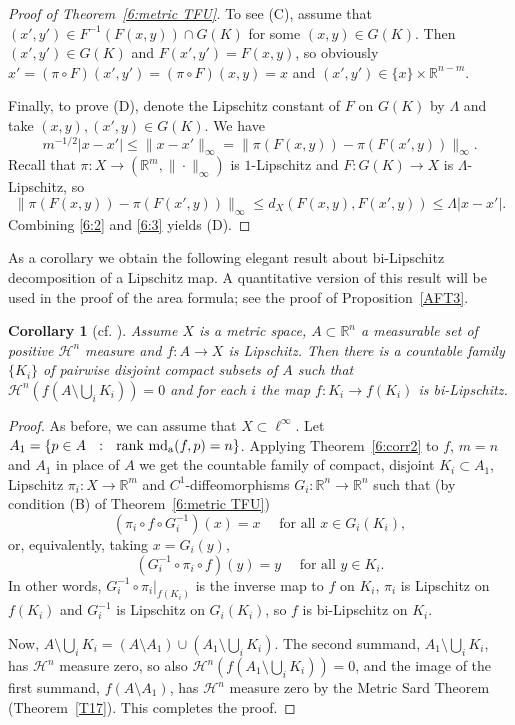 \documentclass[12pt,leqno]{amsart}
\newtheorem{corollary}[theorem]{Corollary}
\theoremstyle{definition}
\newcommand{\bbbr}{\mathbb R}
\def\H{{\mathcal H}}
\def\rank{{\rm rank\,}}
\def\apmd{\operatorname{md_{\rm a}}}
\numberwithin{theorem}{section} \numberwithin{equation}{section}
\begin{document}
\begin{proof}[Proof of Theorem~\ref{6:metric TFU}]
To see (C), assume that $(x',y')\in F^{-1}(F(x,y))\cap G(K)$ for some $(x,y)\in G(K)$. Then $(x',y')\in G(K)$ and $F(x',y')=F(x,y)$, so obviously $x'=(\pi\circ F)(x',y')=(\pi\circ F)(x,y)=x$ and $(x',y')\in \{x\}\times \bbbr^{n-m}$.

Finally, to prove (D), denote the Lipschitz constant of $F$ on $G(K)$ by $\Lambda$ and take $(x,y), (x',y)\in G(K)$. We have
\begin{equation}\label{6:2}
m^{-1/2}|x-x'|\leq \|x-x'\|_\infty=\|\pi(F(x,y))-\pi(F(x',y))\|_\infty.
\end{equation}
Recall that $\pi:X\to (\bbbr^m,\|\cdot\|_\infty)$ is $1$-Lipschitz and $F:G(K)\to X$ is $\Lambda$-Lipschitz, so
\begin{equation}
\label{6:3}
\|\pi(F(x,y))-\pi(F(x',y))\|_\infty\leq d_X(F(x,y),F(x',y))\leq \Lambda |x-x'|.
\end{equation}
Combining \eqref{6:2} and \eqref{6:3} yields (D).
\end{proof}
As a corollary we obtain the following elegant result about bi-Lipschitz decomposition of a Lipschitz map. A quantitative version of this result will be used in the proof of the area formula; see the proof of Proposition~\ref{AFT3}.
\begin{corollary}[cf. {\cite[Lemma 4]{kir}}]
Assume $X$ is a metric space, $A\subset \bbbr^n$ a measurable set of positive $\H^n$ measure and $f:A\to X$ is Lipschitz. Then there is a countable family $\{K_i\}$ of pairwise disjoint compact subsets of $A$ such that $\H^n(f(A\setminus \bigcup_i K_i))=0$ and for each $i$ the map $f:K_i\to f(K_i)$ is bi-Lipschitz.
\end{corollary}
\begin{proof}
As before, we can assume that $X\subset \ell^\infty$.
Let $A_1=\{p\in A~~:~~\rank \apmd(f,p)=n\}$. Applying Theorem~\ref{6:corr2} to $f$, $m=n$ and $A_1$ in place of $A$ we get the countable family of compact, disjoint $K_i\subset A_1$, Lipschitz $\pi_i:X\to\bbbr^m$ and $C^1$-diffeomorphisms $G_i:\bbbr^n\to\bbbr^n$ such that (by condition (B) of Theorem~\ref{6:metric TFU})
$$
(\pi_i\circ f\circ G_i^{-1})(x)=x \quad \text{ for all }x\in G_i(K_i),
$$
or, equivalently, taking $x=G_i(y)$,
$$
(G_i^{-1}\circ \pi_i\circ f) (y)=y \quad \text{ for all  }y\in K_i.
$$
In other words, $G_i^{-1}\circ \pi_i|_{f(K_i)}$ is the inverse map to $f$ on $K_i$, $\pi_i$ is Lipschitz on $f(K_i)$ and $G_i^{-1}$ is Lipschitz on  $G_i(K_i)$, so $f$ is bi-Lipschitz on $K_i$.

Now, $A\setminus \bigcup_i K_i=(A\setminus A_1)\cup (A_1\setminus \bigcup_i K_i)$. The second summand, $A_1\setminus \bigcup_i K_i$, has $\H^n$ measure zero, so also $\H^n(f(A_1\setminus \bigcup_i K_i))=0$, and the image of the first summand, $f(A\setminus A_1)$, has $\H^n$ measure zero by the Metric Sard Theorem (Theorem~\ref{T17}). This completes the proof.
\end{proof}
\end{document}
